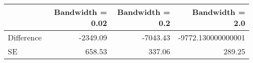 \begin{table}[h!]
\begin{center}
\begin{tabular}{lrrr}
\toprule
 & Bandwidth = 0.02 & Bandwidth = 0.2 & Bandwidth = 2.0  \\
\hline
Difference & -2349.09 & -7043.43 & -9772.130000000001 \\
SE & 658.53 & 337.06 & 289.25 \\
\bottomrule
\end{tabular}
\end{center}
\end{table}
